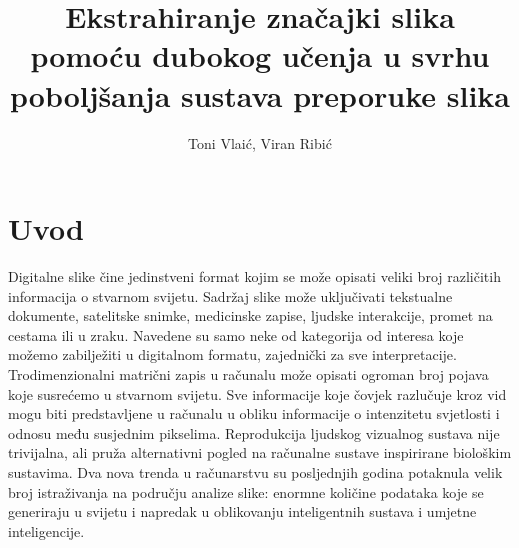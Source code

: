 \documentclass[times, utf8, proizvoljni, numeric]{fer}
\begin{document}
\title{Ekstrahiranje značajki slika pomoću dubokog učenja u svrhu poboljšanja sustava preporuke slika}
\author{Toni Vlaić, Viran Ribić}

\maketitle

\thispagestyle{empty}

\tableofcontents
\thispagestyle{empty}
\listoftables
\thispagestyle{empty}
\listoffigures
\thispagestyle{empty}


\chapter{Uvod}


Digitalne slike čine jedinstveni format kojim se može opisati veliki broj različitih informacija o stvarnom svijetu. Sadržaj slike može uključivati tekstualne dokumente, satelitske snimke, medicinske zapise, ljudske interakcije, promet na cestama ili u zraku. Navedene su samo neke od kategorija od interesa koje možemo zabilježiti u digitalnom formatu, zajednički za sve interpretacije. Trodimenzionalni matrični zapis u računalu može opisati ogroman broj pojava koje susrećemo u stvarnom svijetu. Sve informacije koje čovjek razlučuje kroz vid mogu biti predstavljene u računalu u obliku informacije o intenzitetu svjetlosti i odnosu među susjednim pikselima. Reprodukcija ljudskog vizualnog sustava nije trivijalna, ali pruža alternativni pogled na računalne sustave inspirirane biološkim sustavima. Dva nova trenda u računarstvu su posljednjih godina potaknula velik broj istraživanja na području analize slike: enormne količine podataka koje se generiraju u svijetu i napredak u oblikovanju inteligentnih sustava i umjetne inteligencije. 
\end{document}

